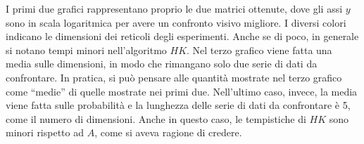 I primi due grafici rappresentano proprio le due matrici ottenute, dove gli assi $y$ sono in scala 
logaritmica per avere un confronto visivo migliore. I diversi colori indicano le dimensioni dei reticoli 
degli esperimenti. Anche se di poco, in generale si notano tempi minori nell'algoritmo $HK$.
Nel terzo grafico viene fatta una media sulle dimensioni, in modo che rimangano solo due serie di dati da confrontare.
In pratica, si può pensare alle quantità mostrate nel terzo grafico come ``medie'' di quelle mostrate nei primi due.
Nell'ultimo caso, invece, la media viene fatta sulle probabilità e la lunghezza delle serie di dati da confrontare è 
5, come il numero di dimensioni. Anche in questo caso, le tempistiche di $HK$ sono minori rispetto ad $A$, come 
si aveva ragione di credere.